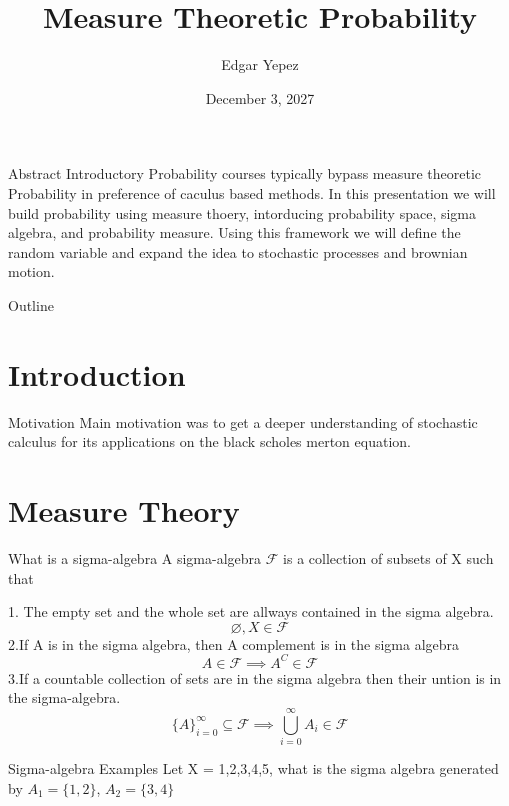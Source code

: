 \documentclass{beamer}
\title{Measure Theoretic Probability}
\author{Edgar Yepez}
\date{December 3, 2027}
\begin{document}
\begin{frame}
  \titlepage
\end{frame}

\begin{frame}{Abstract}
  Introductory Probability courses typically bypass measure theoretic Probability in preference of caculus based methods. In this presentation we will build probability using measure thoery, intorducing probability space, sigma algebra, and probability measure. Using this framework we will define the random variable and expand the idea to stochastic processes and brownian motion.
\end{frame}

\begin{frame}{Outline}
  \tableofcontents
\end{frame}

\section{Introduction}
\begin{frame}{Motivation}
  Main motivation was to get a deeper understanding of stochastic calculus for its applications on the black scholes merton equation. 
\end{frame}


\section{Measure Theory}
\begin{frame}{What is a sigma-algebra}
  A sigma-algebra $\mathcal{F}$ is a collection of subsets of X such that 

  1. The empty set and the whole set are allways contained in the sigma algebra. 
  \[
    \varnothing, X \in \mathcal{F}
  \]
  2.If A is in the sigma algebra, then A complement is in the sigma algebra
  \[
    A \in \mathcal{F} \implies A^C \in \mathcal{F}
  \]
  3.If a countable collection of sets are in the sigma algebra then their untion is in the sigma-algebra. 
  \[
    \{A\}_{i=0}^{\infty} \subseteq \mathcal{F} \implies \bigcup_{i=0}^{\infty}A_i \in \mathcal{F}
  \]
\end{frame}

\begin{frame}{Sigma-algebra Examples}
  Let X = {1,2,3,4,5}, what is the sigma algebra generated by 
  $A_1 = \{1,2\}$, $A_2 = \{3,4\}$
  \[
  \]

\end{frame}
\end{document}
